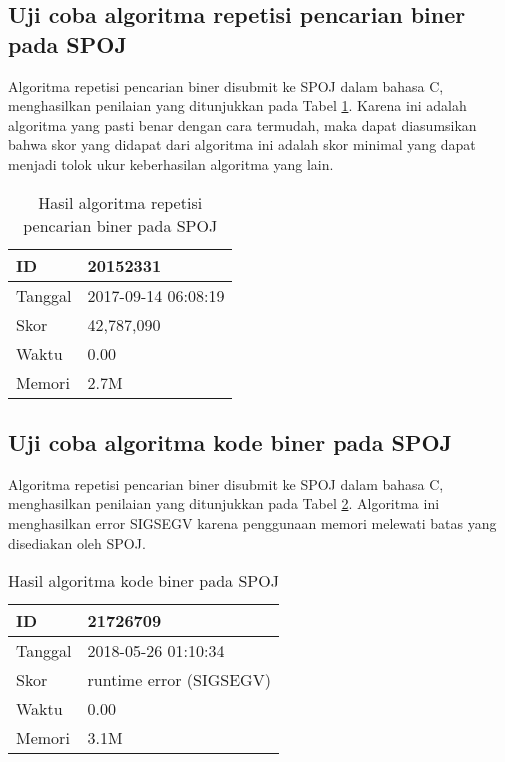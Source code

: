 \subsection{Uji coba algoritma repetisi pencarian biner pada SPOJ}

Algoritma repetisi pencarian biner disubmit ke SPOJ dalam bahasa C, menghasilkan penilaian yang ditunjukkan pada Tabel \ref{tab:score_repetitive}. Karena ini adalah algoritma yang pasti benar dengan cara termudah, maka dapat diasumsikan bahwa skor yang didapat dari algoritma ini adalah skor minimal yang dapat menjadi tolok ukur keberhasilan algoritma yang lain.

\begin{table}[h!]
\caption{Hasil algoritma repetisi pencarian biner pada SPOJ}
\label{tab:score_repetitive}
\begin{center}
\begin{tabular} {|l|l|}
\hline
ID & 20152331 \\ \hline
Tanggal & 2017-09-14 06:08:19 \\ \hline
Skor & 42,787,090 \\ \hline
Waktu & 0.00 \\ \hline
Memori & 2.7M \\ \hline
\end{tabular}
\end{center}
\end{table}

\subsection{Uji coba algoritma kode biner pada SPOJ}

Algoritma repetisi pencarian biner disubmit ke SPOJ dalam bahasa C, menghasilkan penilaian yang ditunjukkan pada Tabel \ref{tab:score_brute_binary_code}. Algoritma ini menghasilkan error SIGSEGV karena penggunaan memori melewati batas yang disediakan oleh SPOJ.

\begin{table}[h!]
\caption{Hasil algoritma kode biner pada SPOJ}
\label{tab:score_brute_binary_code}
\begin{center}
\begin{tabular} {|l|l|}
\hline
ID & 21726709 \\ \hline
Tanggal & 2018-05-26 01:10:34 \\ \hline
Skor & runtime error (SIGSEGV) \\ \hline
Waktu & 0.00 \\ \hline
Memori & 3.1M \\ \hline
\end{tabular}
\end{center}
\end{table}

